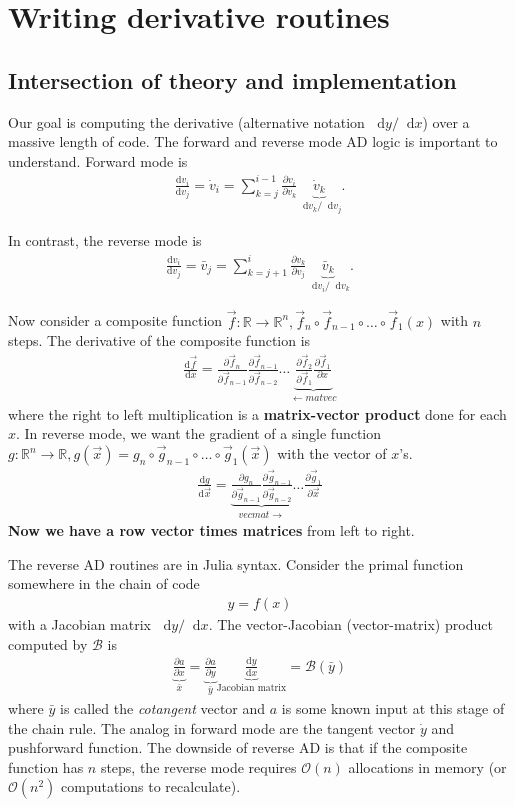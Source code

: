 \documentclass[10pt]{article}
\newcommand{\diff}{\mathop{}\!\mathrm{d}} %
\newcommand{\pp}[2]{\frac{\partial #1}{\partial #2}}
\newcommand{\dd}[2]{\frac{\textrm{d} #1}{\textrm{d} #2}}
\newcommand{\mbb}[1]{\mathbb{#1}} %
\newcommand{\mcal}[1]{\mathcal{#1}} %
\newcommand{\ben}{\begin{eqnarray*}}
\newcommand{\een}{\end{eqnarray*}}
\newcommand{\beq}{\begin{equation}\begin{aligned}}
\newcommand{\eeq}{\end{aligned}\end{equation}}
\newcommand{\BigO}{\mathcal{O}}
\newcommand{\tn}[1]{\textrm{#1}}
\begin{document}
\section{Writing derivative routines}
% 
\subsection{Intersection of theory and implementation}
Our goal is computing the derivative (alternative notation $\diff{y}/\diff{x}$) over a massive length of code.
The forward and reverse mode AD logic is important to understand.
Forward mode is
\beq
 \dd{v_i}{v_j} = \dot{v}_i = \sum_{k=j}^{i-1}\pp{v_i}{v_k} \underbrace{\dot{v}_k}_{\diff{v_k}/\diff{v_j}}
 .
\eeq

In contrast, the reverse mode is
\beq
 \dd{v_i}{v_j} = \bar{v}_j = \sum_{k=j+1}^{i}{\pp{v_k}{v_j}} \underbrace{\bar{v}_k}_{\diff{v_i}/\diff{v_k}}
.
 \eeq

Now consider a composite function $\vec{f}: \mbb{R} \rightarrow \mbb{R}^n, \vec{f}_n \circ \vec{f}_{n-1} \circ \dots \circ \vec{f}_1(x)$ with $n$ steps.
The derivative of the composite function is
\beq
\dd{\vec{f}}{x} = \pp{\vec{f}_n}{\vec{f}_{n-1}} \pp{\vec{f}_{n-1}}{\vec{f}_{n-2}} \dots 
\underbrace{\pp{\vec{f}_2}{\vec{f}_1} \pp{\vec{f}_1}{x}}_{\leftarrow matvec}
\eeq
where the right to left multiplication is a \textbf{matrix-vector product} done for each $x$.
In reverse mode, we want the gradient of a single function $g: \mbb{R}^n \rightarrow \mbb{R}, g(\vec{x}) = g_n \circ \vec{g}_{n-1}\circ \dots \circ \vec{g}_1(\vec{x})$ with the vector of $x$'s.
\beq
\dd{g}{\vec{x}}
=
\underbrace{\pp{g_n}{\vec{g}_{n-1}} \pp{\vec{g}_{n-1}}{\vec{g}_{n-2}}}_{vecmat \rightarrow}
 \dots  \pp{\vec{g}_1}{\vec{x}}
\eeq
\textbf{Now we have a row vector times matrices} from left to right.

The reverse AD routines are in Julia syntax.
Consider the primal function somewhere in the chain of code
\ben
y = f(x)
\een
with a Jacobian matrix $\diff y/\diff x$.
The vector-Jacobian (vector-matrix) product computed by $\mcal{B}$ is
\ben
\underbrace{\pp{a}{x}}_{\bar{x}} =
\underbrace{\pp{a}{y}}_{\bar{y}}
\underbrace{\dd{y}{x}}_{\tn{Jacobian matrix}}
= \mcal{B}({\bar{y}})
\een
where $\bar{y}$ is called the \emph{cotangent} vector and $a$ is some known input at this stage of the chain rule.
The analog in forward mode are the tangent vector $\dot{y}$ and pushforward function.
The downside of reverse AD is that if the composite function has $n$ steps, the reverse mode requires $\BigO(n)$ allocations in memory (or $\BigO(n^2)$ computations to recalculate).
\end{document}
